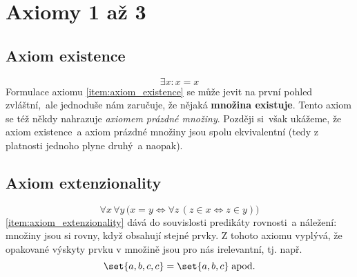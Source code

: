 \section{Axiomy 1 až 3}\label{sec:axiomy_1_az_3}
\subsection{Axiom existence}
\begin{equation*}
    \exists x: x=x
\end{equation*}
Formulace axiomu \ref{item:axiom_existence} se může jevit na první pohled zvláštní,~ale jednoduše nám zaručuje, že nějaká \textbf{množina existuje}. Tento axiom se též někdy nahrazuje \emph{axiomem prázdné množiny}. Později si~však ukážeme, že axiom existence~a axiom prázdné množiny jsou spolu ekvivalentní (tedy z platnosti jednoho plyne druhý~a naopak).

\subsection{Axiom extenzionality}
\begin{equation*}
    \forall x\,\forall y\,\bigl(x=y \iff \forall z\,(z\in x \iff z\in y)\bigr)
\end{equation*}
\ref{item:axiom_extenzionality} dává do souvislosti predikáty rovnosti~a náležení: množiny jsou si rovny, když obsahují stejné prvky. Z tohoto axiomu vyplývá, že opakované výskyty prvku v množině jsou pro nás irelevantní, tj. např.
\begin{equation*}
    \set{a,b,c,c}=\set{a,b,c}\;\text{apod.}
\end{equation*}

